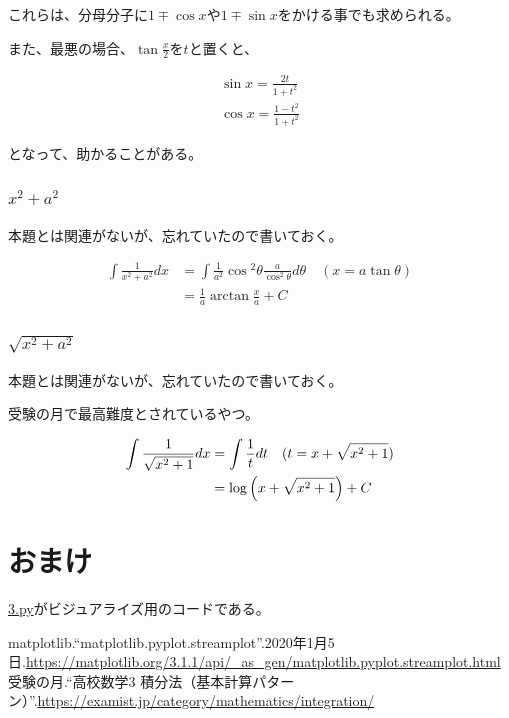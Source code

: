 \documentclass[a4paper, 10pt, dvipdfmx]{jlreq}
\begin{document}
これらは、分母分子に$1\mp\cos{x}$や$1\mp\sin{x}$をかける事でも求められる。

また、最悪の場合、$\tan{\frac{x}{2}}$を$t$と置くと、

\begin{align*}
  \sin{x}=\frac{2t}{1+t^2} \\
  \cos{x}=\frac{1-t^2}{1+t^2}
\end{align*}

となって、助かることがある。

\subsubsection{$x^2+a^2$}

本題とは関連がないが、忘れていたので書いておく。

\begin{align*}
  \int \frac{1}{x^2+a^2} dx & = \int \frac{1}{a^2}\cos{^2\theta} \frac{a}{\cos^2{\theta}}d\theta \quad (x=a\tan{\theta}) \\
                            & = \frac{1}{a}\arctan{\frac{x}{a}}+C
\end{align*}

\subsubsection{$\sqrt{x^2+a^2}$}

本題とは関連がないが、忘れていたので書いておく。

受験の月で最高難度とされているやつ。

\begin{align*}
  \int \frac{1}{\sqrt{x^2+1}} dx & = \int \frac{1}{t} dt \quad (t=x+\sqrt{x^2+1}) \\
                                 & = \log{\qty(x+\sqrt{x^2+1})}+C
\end{align*}


\section{おまけ}

\href{3.py}{3.py}がビジュアライズ用のコードである。



\begin{thebibliography}{9}
  matplotlib.``matplotlib.pyplot.streamplot''.2020年1月5日.\url{https://matplotlib.org/3.1.1/api/_as_gen/matplotlib.pyplot.streamplot.html}
  受験の月.``高校数学3 積分法（基本計算パターン）''.\url{https://examist.jp/category/mathematics/integration/}
\end{thebibliography}
\end{document}
